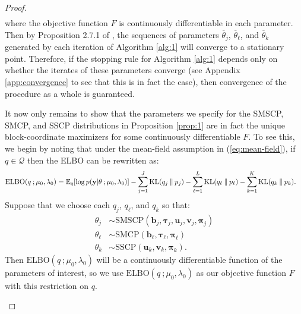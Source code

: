 \begin{proof}
\begin{gather*}
\end{gather*}
where the objective function $F$ is  continuously differentiable in each parameter. Then by Proposition 2.7.1 of \cite{Bertsekas97}, the sequences of parameters $\overline{\theta}_j$, $\overline{\theta}_\ell$, and $\overline{\theta}_k$ generated by each iteration of Algorithm \ref{alg:1} will converge to a stationary point. Therefore, if the stopping rule for Algorithm \ref{alg:1} depends only on whether the iterates of these parameters converge (see Appendix \ref{app:convergence} to see that this is in fact the case), then convergence of the procedure as a whole is guaranteed. 

It now only remains to show that the parameters we specify for the SMSCP, SMCP, and SSCP distributions in Proposition \ref{prop:1} are in fact the unique block-coordinate maximizers for some continuously differentiable $F$. To see this, we begin by noting that under the mean-field assumption in (\ref{eq:mean-field}), if $q \in \mathcal{Q}$ then the ELBO can be rewritten as:
\begin{align}
    \text{ELBO}(q\:;\mu_0,\lambda_0) &= \mathbb{E}_q[\log p(\mathbf{y}| \theta\:; \mu_0,\lambda_0)] - \sum_{j=1}^J \text{KL}(q_j\:\lVert\: p_j) - \sum_{\ell=1}^L \text{KL}(q_\ell\:\lVert\: p_\ell) - \sum_{k=1}^K \text{KL}(q_k\:\lVert\: p_k). \label{eq:elbo-full}
\end{align}
Suppose that we choose each $q_j$, $q_\ell$, and $q_k$ so that:
\begin{align*}
    \theta_j &\sim \text{SMSCP}(\mathbf{b}_j, \boldsymbol{\tau}_j, \mathbf{u}_j, \mathbf{v}_j, \boldsymbol{\pi}_j)\\
    \theta_\ell &\sim \text{SMCP}(\mathbf{b}_\ell, \boldsymbol{\tau}_\ell, \boldsymbol{\pi}_\ell)\\
    \theta_k &\sim \text{SSCP}(\mathbf{u}_k, \mathbf{v}_k, \boldsymbol{\pi}_k). 
\end{align*}
Then $\text{ELBO}(q\:;\mu_0,\lambda_0)$ will be a continuously differentiable function of the parameters of interest, so we use $\text{ELBO}(q\:;\mu_0,\lambda_0)$ as our objective function $F$ with this restriction on $q$.

\begin{enumerate}[label=\roman*.]


\end{enumerate}
\end{proof}

